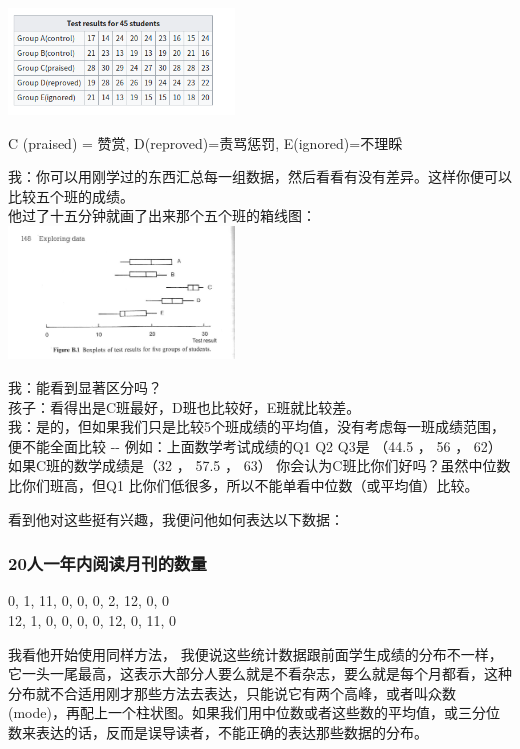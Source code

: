 \includegraphics[width=6cm]{Screenshotfrom2023-01-0222-13-24.png}

C (praised) = 赞赏, D(reproved)=责骂惩罚, E(ignored)=不理睬

我：你可以用刚学过的东西汇总每一组数据，然后看看有没有差异。这样你便可以比较五个班的成绩。\\
他过了十五分钟就画了出来那个五个班的箱线图：\\

\includegraphics[width=6cm]{图片61-3.png}

我：能看到显著区分吗？\\
孩子：看得出是C班最好，D班也比较好，E班就比较差。\\
我：是的，但如果我们只是比较5个班成绩的平均值，没有考虑每一班成绩范围，便不能全面比较
-\/- 例如：上面数学考试成绩的Q1 Q2 Q3是 （44.5 ， 56 ， 62）
如果C班的数学成绩是（32 ， 57.5 ， 63）
你会认为C班比你们好吗？虽然中位数比你们班高，但Q1
比你们低很多，所以不能单看中位数（或平均值）比较。

看到他对这些挺有兴趣，我便问他如何表达以下数据：\\

\hypertarget{ux4ebaux4e00ux5e74ux5185ux9605ux8bfbux6708ux520aux7684ux6570ux91cf}{%
\subsubsection{20人一年内阅读月刊的数量}\label{ux4ebaux4e00ux5e74ux5185ux9605ux8bfbux6708ux520aux7684ux6570ux91cf}}

0, 1, 11, 0, 0, 0, 2, 12, 0, 0\\
12, 1, 0, 0, 0, 0, 12, 0, 11, 0

我看他开始使用同样方法，
我便说这些统计数据跟前面学生成绩的分布不一样，它一头一尾最高，这表示大部分人要么就是不看杂志，要么就是每个月都看，这种分布就不合适用刚才那些方法去表达，只能说它有两个高峰，或者叫众数(mode)，再配上一个柱状图。如果我们用中位数或者这些数的平均值，或三分位数来表达的话，反而是误导读者，不能正确的表达那些数据的分布。\\

